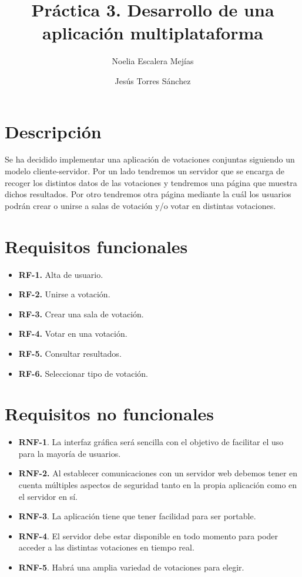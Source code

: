 \documentclass{article}
\title{Práctica 3. Desarrollo de una aplicación multiplataforma}
\author{Noelia Escalera Mejías \and Jesús Torres Sánchez}
\begin{document}
	\maketitle
	\tableofcontents
	\newpage
	
	\section{Descripción}
	Se ha decidido implementar una aplicación de votaciones conjuntas siguiendo un modelo cliente-servidor. Por un lado tendremos un servidor que se encarga de recoger los distintos datos de las votaciones y tendremos una página que muestra dichos resultados. Por otro tendremos otra página mediante la cuál los usuarios podrán crear o unirse a salas de votación y/o votar en distintas votaciones.
	
	\section{Requisitos funcionales}
	\begin{itemize}
		\item \textbf{RF-1.} Alta de usuario.
		\item \textbf{RF-2.} Unirse a votación.
		\item \textbf{RF-3.} Crear una sala de votación.
		\item \textbf{RF-4.} Votar en una votación.
		\item \textbf{RF-5.} Consultar resultados.
		\item \textbf{RF-6.} Seleccionar tipo de votación. \\
	\end{itemize}
	
	\section{Requisitos no funcionales}
	\begin{itemize}
		\item \textbf{RNF-1}. La interfaz gráfica será sencilla con el objetivo de facilitar el uso para la mayoría de usuarios.
		\item \textbf{RNF-2.} Al establecer comunicaciones con un servidor web debemos tener
		en cuenta múltiples aspectos de seguridad tanto en la propia aplicación
		como en el servidor en sí.
		\item \textbf{RNF-3}. La aplicación tiene que tener facilidad para ser portable.
		\item \textbf{RNF-4}. El servidor debe estar disponible en todo momento para poder
		acceder a las distintas votaciones en tiempo real.
		\item \textbf{RNF-5}. Habrá una amplia variedad de votaciones para elegir.
	\end{itemize}
\end{document}
